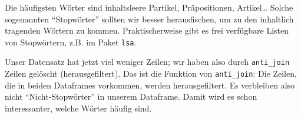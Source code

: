 \documentclass[12pt,]{book}
\newenvironment{Shaded}{\begin{snugshade}}{\end{snugshade}}
\newcommand{\KeywordTok}[1]{\textcolor[rgb]{0.13,0.29,0.53}{\textbf{{#1}}}}
\newcommand{\DataTypeTok}[1]{\textcolor[rgb]{0.13,0.29,0.53}{{#1}}}
\newcommand{\DecValTok}[1]{\textcolor[rgb]{0.00,0.00,0.81}{{#1}}}
\newcommand{\StringTok}[1]{\textcolor[rgb]{0.31,0.60,0.02}{{#1}}}
\newcommand{\CommentTok}[1]{\textcolor[rgb]{0.56,0.35,0.01}{\textit{{#1}}}}
\newcommand{\OtherTok}[1]{\textcolor[rgb]{0.56,0.35,0.01}{{#1}}}
\newcommand{\NormalTok}[1]{{#1}}
\begin{document}
\begin{Shaded}
\end{Shaded}

Die häufigsten Wörter sind inhaltsleere Partikel, Präpositionen,
Artikel\ldots{} Solche sogenannten ``Stopwörter'' sollten wir besser
herausfischen, um zu den inhaltlich tragenden Wörtern zu kommen.
Praktischerweise gibt es frei verfügbare Listen von Stopwörtern, z.B. im
Paket \texttt{lsa}.

\begin{Shaded}
\end{Shaded}

Unser Datensatz hat jetzt viel weniger Zeilen; wir haben also durch
\texttt{anti\_join} Zeilen gelöscht (herausgefiltert). Das ist die
Funktion von \texttt{anti\_join}: Die Zeilen, die in beiden Dataframes
vorkommen, werden herausgefiltert. Es verbleiben also nicht
``Nicht-Stopwörter'' in unserem Dataframe. Damit wird es schon
interessanter, welche Wörter häufig sind.

\begin{Shaded}
\end{Shaded}
\end{document}
